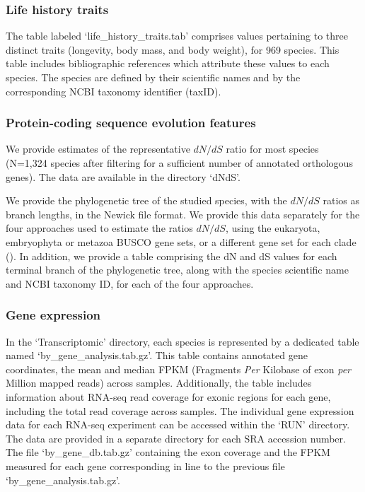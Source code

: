 \subsubsection{Life history traits}
The table labeled `life\_history\_traits.tab' comprises values pertaining to three distinct traits (longevity, body mass, and body weight), for 969 species. This table includes bibliographic references which attribute these values to each species. The species are defined by their scientific names and by the corresponding NCBI taxonomy identifier (taxID). 

\subsubsection{Protein-coding sequence evolution features}
We provide estimates of the representative ${dN}/{dS}$ ratio for most species (N=1,324 species after filtering for a sufficient number of annotated orthologous genes). The data are available in the directory `dNdS'.

We provide the phylogenetic tree of the studied species, with the ${dN}/{dS}$ ratios as branch lengths, in the Newick file format. We provide this data separately for the four approaches used to estimate the ratios ${dN}/{dS}$, using the eukaryota, embryophyta or metazoa \acrshort{BUSCO} gene sets, or a different gene set for each clade (). In addition, we provide a table comprising the dN and dS values for each terminal branch of the phylogenetic tree, along with the species scientific name and NCBI taxonomy ID, for each of the four approaches.

\subsubsection{Gene expression}
In the `Transcriptomic' directory, each species is represented by a dedicated table named `by\_gene\_analysis.tab.gz'. This table contains annotated gene coordinates, the mean and median \acrshort{FPKM} (Fragments \textit{Per} Kilobase of exon \textit{per} Million mapped reads) across samples. Additionally, the table includes information about RNA-seq read coverage for exonic regions for each gene, including the total read coverage across samples. The individual gene expression data for each RNA-seq experiment can be accessed within the `RUN' directory. The data are provided in a separate directory for each SRA accession number. The file `by\_gene\_db.tab.gz' containing the exon coverage and the \acrshort{FPKM} measured for each gene corresponding in line to the previous file `by\_gene\_analysis.tab.gz'.

